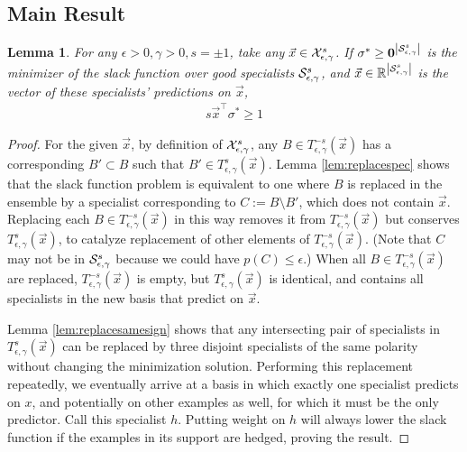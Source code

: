 \documentclass{article}
\newtheorem{lemma}[theorem]{Lemma}
\newcommand{\x}{\vec{x}}
\newcommand{\RR}{\mathbb{R}}      %
\newcommand{\abs}[1]{\left| #1 \right|}
\newcommand{\vzero}{\mathbf{0}}
\newcommand{\comment}[3]{\marginpar{\textcolor{#2}{#1: #3}}}
\newcommand{\akshay}[1]{\comment{Akshay}{magenta}{#1}}
\begin{document}
\subsection{Main Result}

\begin{lemma}
For any $\epsilon > 0, \gamma > 0, s = \pm 1$, take any $\x \in \XepsGamSig$. 
If $\sigma^* \geq \vzero^{\abs{\SepsGam^{s}}}$ is the minimizer of the slack function over good specialists ${\cal S}_{\epsilon,\gamma}^{s}$, 
and $\x \in \RR^{\abs{\SepsGam^{s}}}$ is the vector of these specialists' predictions on $\x$, 
\begin{align}
s \x^\top \sigma^* \geq 1
\end{align}
\end{lemma}
\begin{proof}
For the given $\x$, by definition of ${\cal X}_{\epsilon,\gamma}^{s}$, 
any $B \in T_{\epsilon, \gamma}^{-s} (\x)$ has a corresponding $B' \subset B$ such that $B' \in T_{\epsilon, \gamma}^{s} (\x)$. 
Lemma \ref{lem:replacespec} shows that the slack function problem is equivalent to one where $B$ is replaced in the ensemble by a specialist corresponding to $C := B \setminus B'$, 
which does not contain $\x$. 
Replacing each $B \in T_{\epsilon, \gamma}^{-s} (\x)$ in this way removes it from $T_{\epsilon, \gamma}^{-s} (\x)$ but conserves $T_{\epsilon, \gamma}^{s} (\x)$, 
to catalyze replacement of other elements of $T_{\epsilon, \gamma}^{-s} (\x)$. 
(Note that $C$ may not be in ${\cal S}_{\epsilon,\gamma}^{s}$ because we could have $p(C) \leq \epsilon$.)
When all $B \in T_{\epsilon, \gamma}^{-s} (\x)$ are replaced, $T_{\epsilon, \gamma}^{-s} (\x)$ is empty, 
but $T_{\epsilon, \gamma}^{s} (\x)$ is identical, 
and contains all specialists in the new basis that predict on $\x$. 

Lemma \ref{lem:replacesamesign} shows that any intersecting pair of specialists in $T_{\epsilon, \gamma}^{s} (\x)$ can be replaced by three disjoint specialists of the same polarity without changing the minimization solution. 
Performing this replacement repeatedly, we eventually arrive at a basis in which exactly one specialist predicts on $x$, and potentially on other examples as well, for which it must be the only predictor. Call this specialist $h$.
Putting weight on $h$ will always lower the slack function if the examples in its support are hedged, proving the result.
\end{proof}

\akshay{Not sure about this because $h$ may have bias $< 0$ even though its parent specialists do not. }
\end{document}
